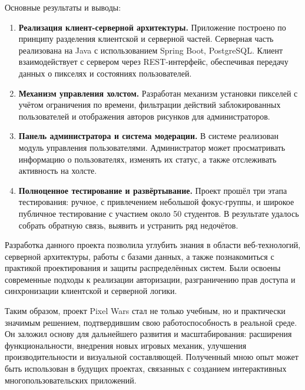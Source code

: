Основные результаты и выводы:
\begin{enumerate}
    \item
          \textbf{Реализация клиент-серверной архитектуры.} Приложение построено по принципу разделения клиентской и серверной частей. Серверная часть реализована на Java с использованием Spring Boot, PostgreSQL. Клиент взаимодействует с сервером через REST-интерфейс, обеспечивая передачу данных о пикселях и состояниях пользователей.
    \item
          \textbf{Механизм управления холстом.} Разработан механизм установки пикселей с учётом ограничения по времени, фильтрации действий заблокированных пользователей и отображения авторов рисунков для администраторов.
    \item
          \textbf{Панель администратора и система модерации.} В системе реализован модуль управления пользователями. Администратор может просматривать информацию о пользователях, изменять их статус, а также отслеживать активность на холсте.
    \item
          \textbf{Полноценное тестирование и развёртывание.} Проект прошёл три этапа тестирования: ручное, с привлечением небольшой фокус-группы, и широкое публичное тестирование с участием около 50 студентов. В результате удалось собрать обратную связь, выявить и устранить ряд недочётов.
\end{enumerate}


Разработка данного проекта позволила углубить знания в области веб-технологий, серверной архитектуры, работы с базами данных, а также познакомиться с практикой проектирования и защиты распределённых систем. Были освоены современные подходы к реализации авторизации, разграничению прав доступа и синхронизации клиентской и серверной логики.

Таким образом, проект Pixel Wars стал не только учебным, но и практически значимым решением, подтвердившим свою работоспособность в реальной среде. Он заложил основу для дальнейшего развития и масштабирования: расширения функциональности, внедрения новых игровых механик, улучшения производительности и визуальной составляющей. Полученный мною опыт может быть использован в будущих проектах, связанных с созданием интерактивных многопользовательских приложений.